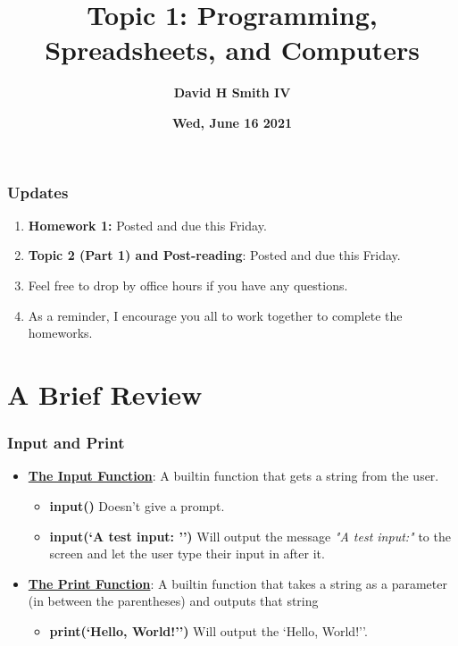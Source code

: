 \documentclass{beamer}
\title{\textbf{Topic 1: Programming, Spreadsheets, and Computers}}
\author{\textbf{David H Smith IV}}
\institute[\textbf{UIUC}]{\textbf{University of Illinois Urbana-Champaign}}
\date{\textbf{Wed, June 16 2021}}
\begin{document}
\frame{\titlepage}

\begin{frame}
  \frametitle{Updates}
  \begin{enumerate}
    \item \textbf{Homework 1:} Posted and due this Friday.
    \item \textbf{Topic 2 (Part 1) and Post-reading}: Posted and due this Friday.
    \item Feel free to drop by office hours if you have any questions.
    \item As a reminder, I encourage you all to work together to complete the homeworks.
  \end{enumerate}
\end{frame}

\section{A Brief Review}

\begin{frame}
  \frametitle{Input and Print}
  \begin{itemize}
    \item \underline{\textbf{The Input Function}}: A builtin function that gets a string from the user.
      \begin{itemize}
        \item \textbf{input()} \textrightarrow Doesn't give a prompt.
        \item \textbf{input(`A test input: '')} \textrightarrow Will output the message \textit{"A test input:"} to the screen and let the user type their input in after it.
      \end{itemize}
    \item \underline{\textbf{The Print Function}}: A builtin function that takes a string as a parameter (in between the parentheses) and outputs that string
      \begin{itemize}
        \item \textbf{print(`Hello, World!'')} \textrightarrow Will output the `Hello, World!''. 
      \end{itemize}
  \end{itemize}
\end{frame}
\end{document}

